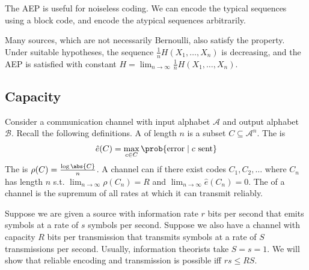 \begin{remark}
    The AEP is useful for noiseless coding.
    We can encode the typical sequences using a block code, and encode the atypical sequences arbitrarily.

    Many sources, which are not necessarily Bernoulli, also satisfy the property.
    Under suitable hypotheses, the sequence $\frac{1}{n} H(X_1, \dots, X_n)$ is decreasing, and the AEP is satisfied with constant $H = \lim_{n \to \infty} \frac{1}{n} H(X_1, \dots, X_n)$.
\end{remark}

\subsection{Capacity}
Consider a communication channel with input alphabet $\mathcal A$ and output alphabet $\mathcal B$.
Recall the following definitions.
A  of length $n$ is a subset $C \subseteq \mathcal A^n$.
The  is
\begin{align*}
        \hat e(C) = \max_{c \in C} \prob{\text{error} \mid c \text{ sent}}
    \end{align*}
The  is $\rho(C) = \frac{\log \abs{C}}{n}$.
A channel can  if there exist codes $C_1, C_2, \dots$ where $C_n$ has length $n$ s.t. $\lim_{n \to \infty} \rho(C_n) = R$ and $\lim_{n \to \infty} \hat e(C_n) = 0$.
The  of a channel is the supremum of all rates at which it can transmit reliably.

Suppose we are given a source with information rate $r$ bits per second that emits symbols at a rate of $s$ symbols per second.
Suppose we also have a channel with capacity $R$ bits per transmission that transmits symbols at a rate of $S$ transmissions per second.
Usually, information theorists take $S = s = 1$.
We will show that reliable encoding and transmission is possible iff $rs \leq RS$.

